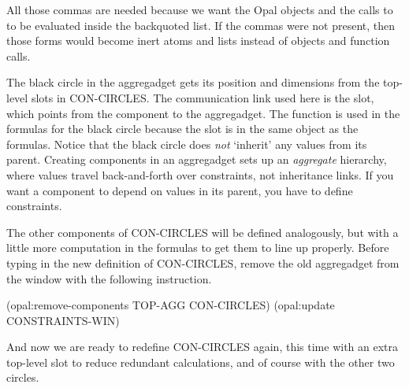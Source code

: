 All those commas are needed because we want the Opal objects and the
calls to  to be evaluated inside the backquoted list.
If the commas were not present, then those forms would become inert
atoms and lists instead of objects and function calls.

The black circle in the aggregadget gets its position and
dimensions from the top-level slots in CON-CIRCLES.  The communication
link used here is the  slot, which points from the
component to the aggregadget.  The function
 is used in the formulas for the black circle because the
 slot is in the same object as the formulas.  Notice that
the black circle does {\it not} `inherit' any values from its parent.
Creating components in an aggregadget sets up an {\it aggregate}
hierarchy, where values travel back-and-forth over constraints,
not inheritance links.  If you want a component to depend on values in
its parent, you have to define constraints.

The other components of CON-CIRCLES will be defined analogously, but with
a little more computation in the formulas to get them to line up properly.
Before typing in the new definition of CON-CIRCLES, remove the old
aggregadget from the window with the following instruction.

\begin{programexample}
(opal:remove-components TOP-AGG CON-CIRCLES)
(opal:update CONSTRAINTS-WIN)
\end{programexample}

And now we are ready to redefine CON-CIRCLES again, this time with an
extra top-level slot to reduce redundant calculations, and of course
with the other two circles.

